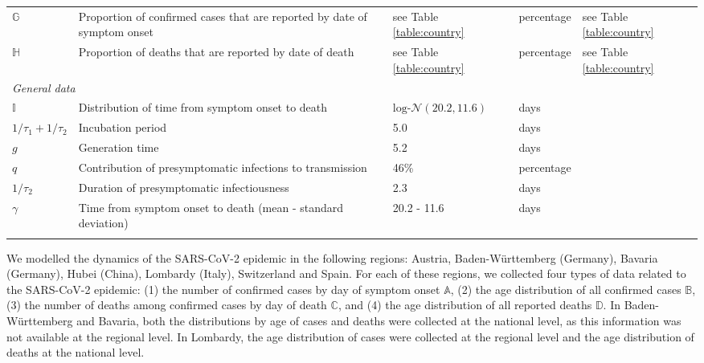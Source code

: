 \documentclass{article}
\begin{document}
\begin{table}[h]
\begin{tabular}{p{1.6cm}p{6cm}lll}
			$\mathds{G}$ & Proportion of confirmed cases that are reported by date of symptom onset& see Table \ref{table:country} & percentage & see Table \ref{table:country}\\
			$\mathds{H}$ & Proportion of deaths that are reported by date of death & see Table \ref{table:country} & percentage & see Table \ref{table:country}\\
			\hline
\multicolumn{3}{l}{\textit{General data}}\\
			$\mathds{I}$ & Distribution of time from symptom onset to death & $\text{log-}\mathcal{N}(20.2,11.6)$ & days & \cite{Linton2020a} \\
			$1/\tau_1+1/\tau_2$ & Incubation period & 5.0 & days &  \cite{bi2020epidemiology,li2020early,linton2020incubation,liu2020contribution,zhang2020evolving}\\
			$g$ & Generation time & 5.2 & days & \cite{bi2020epidemiology,ganyani2020estimating}\\
			$q$ & Contribution of presymptomatic infections to transmission & 46\% & percentage & \cite{liu2020contribution,ganyani2020estimating,he2020temporal}\\
			$1/\tau_2$ & Duration of presymptomatic infectiousness & 2.3 & days & \cite{he2020temporal} \\
			$\gamma$ & Time from symptom onset to death (mean - standard deviation) & 20.2 - 11.6 & days & \cite{Linton2020} \\
			\hline \\[-2.5em]
		\end{tabular} 
	\end{table}


We modelled the dynamics of the SARS-CoV-2 epidemic in the following regions: Austria, Baden-Württemberg (Germany), Bavaria (Germany), Hubei (China), Lombardy (Italy), Switzerland and Spain. For each of these regions, we collected four types of data related to the SARS-CoV-2 epidemic: (1) the number of confirmed cases by day of symptom onset $\mathds{A}$, (2) the age distribution of all confirmed cases $\mathds{B}$, (3) the number of deaths among confirmed cases by day of death $\mathds{C}$, and (4) the age distribution of all reported deaths $\mathds{D}$. In Baden-Württemberg and Bavaria, both the distributions by age of cases and deaths were collected at the national level, as this information was not available at the regional level. In Lombardy, the age distribution of cases were collected at the regional level and the age distribution of deaths at the national level. 
\end{document}

